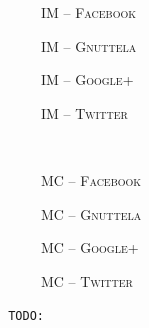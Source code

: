 \documentclass{article}
\newlength\figureheight
\newlength\figurewidth
\newcommand{\todo}[1]{\noindent\texttt{\small\color[rgb]{0.5,0.1,0.1} TODO: #1}}
\newcommand{\fbook}{\textsc{Facebook}}
\newcommand{\gnutella}{\textsc{Gnuttela}}
\newcommand{\gplus}{\textsc{Google+}}
\newcommand{\twitter}{\textsc{Twitter}}
\newcommand{\infmax}{IM}
\newcommand{\maxcut}{MC}
\begin{document}
\setlength{}
\setlength{}
\newcommand{\subflen}{0.245\textwidth}
\newcommand{\scspacey}{-1.5em}
\newcommand{\scspacex}{0.5em}
\begin{figure}[tb]
  \begin{subfigure}[b]{\subflen}
    \centering
    
    \vspace{\scspacey}
    \caption{\hspace{\scspacex}\infmax{} -- \fbook}
    \label{fig:inf_ego_fb}
  \end{subfigure}
  \begin{subfigure}[b]{\subflen}
    
    \vspace{\scspacey}
    \caption{\hspace{\scspacex}\infmax{} -- \gnutella}
    \label{fig:inf_gnutella}
  \end{subfigure}
  \begin{subfigure}[b]{\subflen}
    
    \vspace{\scspacey}
    \caption{\hspace{\scspacex}\infmax{} -- \gplus}
    \label{fig:inf_gplus}
  \end{subfigure}
  \begin{subfigure}[b]{\subflen}
    
    \vspace{\scspacey}
    \caption{\hspace{\scspacex}\infmax{} -- \twitter}
    \label{fig:inf_twitter}
  \end{subfigure}\\[0.5em]
  \begin{subfigure}[b]{\subflen}
    
    \vspace{\scspacey}
    \caption{\hspace{\scspacex}\maxcut{} -- \fbook}
    \label{fig:mc_ego_fb}
  \end{subfigure}
  \begin{subfigure}[b]{\subflen}
    
    \vspace{\scspacey}
    \caption{\hspace{\scspacex}\maxcut{} -- \gnutella}
    \label{fig:mc_gnutella}
  \end{subfigure}
  \begin{subfigure}[b]{\subflen}
    
    \vspace{\scspacey}
    \caption{\hspace{\scspacex}\maxcut{} -- \gplus}
    \label{fig:mc_gplus}
  \end{subfigure}
  \begin{subfigure}[b]{\subflen}
    
    \vspace{\scspacey}
    \caption{\hspace{\scspacex}\maxcut{} -- \twitter}
    \label{fig:mc_twitter}
  \end{subfigure}
  \caption{
    \todo{}
  }
  \label{fig:exp}
\end{figure}
\end{document}
